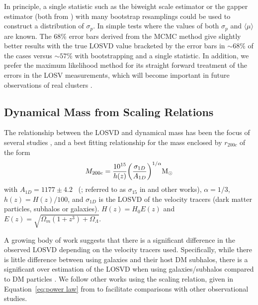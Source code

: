 \documentclass[fleqn,usenatbib]{mnras}
\newcommand{\editorial}[1]{\textcolor{red}{#1}}
\begin{document}
In principle, a single statistic such as the biweight scale estimator or the gapper estimator (both from \citealt{Beers1990}) with many bootstrap resamplings could be used to construct a distribution of $\sigma_p$. In simple tests where the values of both $\sigma_p$ and $\langle\mu\rangle$ are known. The 68\% error bars derived from the MCMC method give slightly better results with the true LOSVD value bracketed by the error bars in $\sim68\%$ of the cases versus $\sim57\%$ with bootstrapping and a single statistic. In addition, we prefer the maximum likelihood method for its straight forward treatment of the errors in the LOSV measurements, which will become important in future observations of real clusters .

\subsection{Dynamical Mass from Scaling Relations}\label{sec: mass}
The relationship between the LOSVD and dynamical mass has been the focus of several studies , and a best fitting relationship for the mass enclosed by $r_{200c}$ of the form
\begin{equation}\label{eq:power law}
	M_{200c} = \frac{10^{15}}{h(z)} \bigg{(}\frac{\sigma_{1D}}{A_{1D}} \bigg{)}^{1/\alpha} \hbox{$\mathrm{M}_\odot$}
\end{equation}
with $A_{1D} = 1177 \pm 4.2$ \kms\ (\citealt{Munari2013}; referred to as $\sigma_{15}$ in \citealt{Evrard2008} and other works), $\alpha = 1/3$, $h(z) = H(z)/100$, and $\sigma_{1D}$ is the LOSVD of the velocity tracers (dark matter particles, subhalos or galaxies). $H(z) = H_0 E(z)$ and $E(z) = \sqrt{\Omega_m(1+z^3)+\Omega_{\Lambda}}$.

A growing body of work suggests that there is a significant difference in the observed LOSVD depending on the velocity tracers used. Specifically, while there is little difference between using galaxies and their host DM subhalos, there is a significant over estimation of the LOSVD when using galaxies/subhalos compared to DM particles \citep{Munari2013}. We follow other works  using the scaling relation, given in Equation~\ref{eq:power law} from \cite{Munari2013} to facilitate comparisons with other observational studies. 
\end{document}
